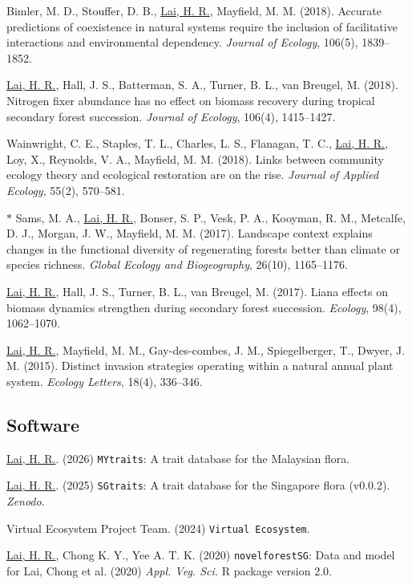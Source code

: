 \documentclass[a4paper]{article}
\begin{document}
\hangindent=1cm Bimler, M. D., Stouffer, D. B., \underline{Lai, H. R.}, Mayfield, M. M. (2018). Accurate predictions of coexistence in natural systems require the inclusion of facilitative interactions and environmental dependency. \textit{Journal of Ecology}, 106(5), 1839–1852.

\hangindent=1cm \underline{Lai, H. R.}, Hall, J. S., Batterman, S. A., Turner, B. L., van Breugel, M. (2018). Nitrogen fixer abundance has no effect on biomass recovery during tropical secondary forest succession. \textit{Journal of Ecology}, 106(4), 1415–1427.

\hangindent=1cm Wainwright, C. E., Staples, T. L., Charles, L. S., Flanagan, T. C., \underline{Lai, H. R.}, Loy, X., Reynolds, V. A., Mayfield, M. M. (2018). Links between community ecology theory and ecological restoration are on the rise. \textit{Journal of Applied Ecology}, 55(2), 570–581.

$\ast$ \hangindent=1cm Sams, M. A., \underline{Lai, H. R.}, Bonser, S. P., Vesk, P. A., Kooyman, R. M., Metcalfe, D. J., Morgan, J. W., Mayfield, M. M. (2017). Landscape context explains changes in the functional diversity of regenerating forests better than climate or species richness. \textit{Global Ecology and Biogeography}, 26(10), 1165–1176.

\hangindent=1cm \underline{Lai, H. R.}, Hall, J. S., Turner, B. L., van Breugel, M. (2017). Liana effects on biomass dynamics strengthen during secondary forest succession. \textit{Ecology}, 98(4), 1062–1070.

\hangindent=1cm \underline{Lai, H. R.}, Mayfield, M. M., Gay-des-combes, J. M., Spiegelberger, T., Dwyer, J. M. (2015). Distinct invasion strategies operating within a natural annual plant system. \textit{Ecology Letters}, 18(4), 336–346.

\subsection*{Software}
\hangindent=1cm \underline{Lai, H. R.}. (2026) \texttt{MYtraits}: A trait database for the Malaysian flora.

\hangindent=1cm \underline{Lai, H. R.}. (2025) \texttt{SGtraits}: A trait database for the Singapore flora (v0.0.2). \textit{Zenodo}.

\hangindent=1cm Virtual Ecosystem Project Team. (2024) \texttt{Virtual Ecosystem}.

\hangindent=1cm \underline{Lai, H. R.}, Chong K. Y., Yee A. T. K. (2020) \texttt{novelforestSG}: Data and model for Lai, Chong et al. (2020) \textit{Appl. Veg. Sci.} R package version 2.0.
\end{document}
